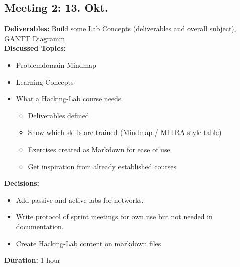 \subsection*{Meeting 2: 13. Okt.}
\textbf{Deliverables:} Build some Lab Concepts (deliverables and overall subject), GANTT Diagramm \\
\textbf{Discussed Topics:} 
\begin{itemize}
    \item Problemdomain Mindmap
    \item Learning Concepts
    \item What a Hacking-Lab course needs
    \begin{itemize}
        \item Deliverables defined
        \item Show which skills are trained (Mindmap / MITRA style table)
        \item Exercises created as Markdown for ease of use 
        \item Get inspiration from already established courses
    \end{itemize}
\end{itemize}
\textbf{Decisions:} 
\begin{itemize}
    \item Add passive and active labs for networks.
    \item Write protocol of sprint meetings for own use but not needed in documentation.
    \item Create Hacking-Lab content on markdown files
\end{itemize} 
\textbf{Duration:} 1 hour
